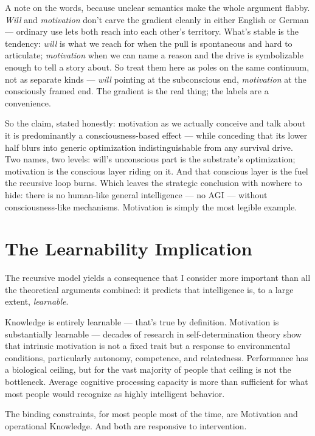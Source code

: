 \documentclass[11pt, twoside, openright]{book}
\begin{document}
A note on the words, because unclear semantics make the whole argument flabby. \textit{Will} and \textit{motivation} don't carve the gradient cleanly in either English or German --- ordinary use lets both reach into each other's territory. What's stable is the tendency: \textit{will} is what we reach for when the pull is spontaneous and hard to articulate; \textit{motivation} when we can name a reason and the drive is symbolizable enough to tell a story about. So treat them here as poles on the same continuum, not as separate kinds --- \textit{will} pointing at the subconscious end, \textit{motivation} at the consciously framed end. The gradient is the real thing; the labels are a convenience.

So the claim, stated honestly: motivation as we actually conceive and talk about it is predominantly a consciousness-based effect --- while conceding that its lower half blurs into generic optimization indistinguishable from any survival drive. Two names, two levels: will's unconscious part is the substrate's optimization; motivation is the conscious layer riding on it. And that conscious layer is the fuel the recursive loop burns. Which leaves the strategic conclusion with nowhere to hide: there is no human-like general intelligence --- no AGI --- without consciousness-like mechanisms. Motivation is simply the most legible example.

\section*{The Learnability Implication}

The recursive model yields a consequence that I consider more important than all the theoretical arguments combined: it predicts that intelligence is, to a large extent, \textit{learnable}.

Knowledge is entirely learnable --- that's true by definition. Motivation is substantially learnable --- decades of research in self-determination theory show that intrinsic motivation is not a fixed trait but a response to environmental conditions, particularly autonomy, competence, and relatedness. Performance has a biological ceiling, but for the vast majority of people that ceiling is not the bottleneck. Average cognitive processing capacity is more than sufficient for what most people would recognize as highly intelligent behavior.

The binding constraints, for most people most of the time, are Motivation and operational Knowledge. And both are responsive to intervention.
\end{document}
